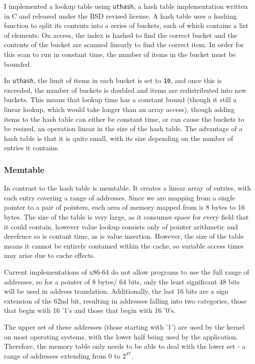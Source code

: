I implemented a lookup table using \verb!uthash!, a hash table implementation written in C and released under the BSD revised license. 
A hash table uses a hashing function to split its contents into a series of buckets, each of which contains a list of elements.
On access, the index is hashed to find the correct bucket and the contents of the bucket are scanned linearly to find the correct item.
In order for this scan to run in constant time, the number of items in the bucket must be bounded.

In \verb!uthash!, the limit of items in each bucket is set to \verb!10!, and once this is exceeded, the number of buckets is doubled and items are redistributed into new buckets.
This means that lookup time has a constant bound (though it still a linear lookup, which would take longer than an array access), though adding items to the hash table can either be constant time, or can cause the buckets to be resized, an operation linear in the size of the hash table.
The advantage of a hash table is that it is quite small, with its size depending on the number of entries it contains.

\subsubsection{Memtable}

In contrast to the hash table is memtable.
It creates a linear array of entries, with each entry covering a range of addresses.
Since we are mapping from a single pointer to a pair of pointers, each area of memory mapped from is 8 bytes to 16 bytes.
The size of the table is very large, as it consumes space for every field that it could contain, however value lookup consists only of pointer arithmetic and derefence so is contant time, as is value insertion.
However, the size of the table means it cannot be entirely contained within the cache, so variable access times may arise due to cache effects.

Current implementations of x86-64 do not allow programs to use the full range of addresses, so for a pointer of 8 bytes/ 64 bits, only the least significant 48 bits will be used in address translation.
Additionally, the last 16 bits are a sign extension of the 62nd bit, resulting in addresses falling into two categories, those that begin with 16 '1's and those that begin with 16 '0's.

The upper set of these addresses (those starting with '1') are used by the kernel on most operating systems, with the lower half being used by the application.
Therefore, the memory table only needs to be able to deal with the lower set - a range of addresses extending from $0$ to $2^{47}$.


